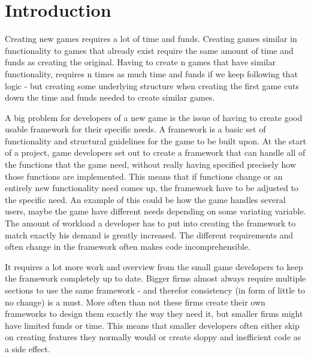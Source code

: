 \chapter{Introduction}
\label{chap:intro}





Creating new games requires a lot of time and funds. Creating games similar in functionality to games that already exist require the same amount of time and funds as creating the original. Having to create n games that have similar functionality, requires n times as much time and funds if we keep following that logic - but creating some underlying structure when creating the first game cuts down the time and funds needed to create similar games.

A big problem for developers of a new game is the issue of having to create good usable framework for their specific needs. A framework is a basic set of functionality and structural guidelines for the game to be built upon. At the start of a project, game developers set out to create a framework that can handle all of the functions that the game need, without really having specified precisely how those functions are implemented. This means that if functions change or an entirely new functionality need comes up, the framework have to be adjusted to the specific need. An example of this could be how the game handles several users, maybe the game have different needs depending on some variating variable. The amount of workload a developer has to put into creating the framework to match exactly his demand is greatly increased. The different requirements and often change in the framework often makes code incomprehensible.

It requires a lot more work and overview from the small game developers to keep the framework completely up to date. Bigger firms almost always require multiple sections to use the same framework - and therefor consistency (in form of little to no change) is a must. More often than not these firms create their own frameworks to design them exactly the way they need it, but smaller firms might have limited funds or time. This means that smaller developers often either skip on creating features they normally would or create sloppy and inefficient code as a side effect.

